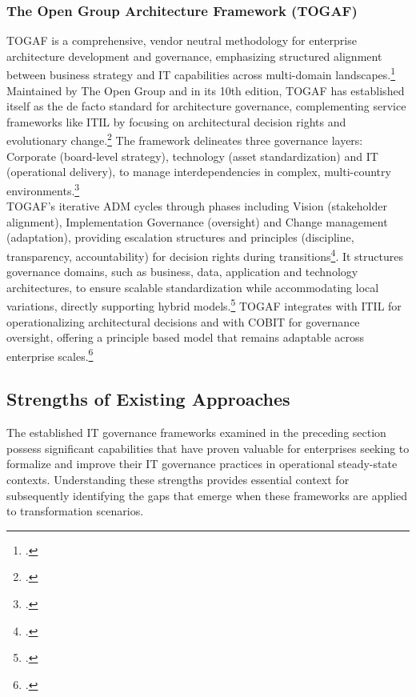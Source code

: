 \subsubsection{The Open Group Architecture Framework (TOGAF)}
\label{subsubsec:TOGAF}
\ac{TOGAF} is a comprehensive, vendor neutral methodology for enterprise architecture development and governance, emphasizing structured alignment between business strategy and IT capabilities across multi-domain landscapes.\footcite[607]{krcmarInformationsmanagement2015}
Maintained by The Open Group and in its 10th edition, \ac{TOGAF} has established itself as the de facto standard for architecture governance, complementing service frameworks like \ac{ITIL} by focusing on architectural decision rights and evolutionary change.\footcite[622]{krcmarInformationsmanagement2015}
The framework delineates three governance layers: Corporate (board-level strategy), technology (asset standardization) and IT (operational delivery), to manage interdependencies in complex, multi-country environments.\footcite[607]{krcmarInformationsmanagement2015}
\\
\ac{TOGAF}'s iterative \ac{ADM} cycles through phases including Vision (stakeholder alignment), Implementation Governance (oversight) and Change management (adaptation), providing escalation structures and principles (discipline, transparency, accountability) for decision rights during transitions\footcite[607-608]{krcmarInformationsmanagement2015}.
It structures governance domains, such as business, data, application and technology architectures, to ensure scalable standardization while accommodating local variations, directly supporting hybrid models.\footcite[622]{krcmarInformationsmanagement2015}
\ac{TOGAF} integrates with \ac{ITIL} for operationalizing architectural decisions and with \ac{COBIT} for governance oversight, offering a principle based model that remains adaptable across enterprise scales.\footcite[608]{krcmarInformationsmanagement2015}

\subsection{Strengths of Existing Approaches}
\label{subsec:StrengthsOfExistingApproaches}
The established IT governance frameworks examined in the preceding section possess significant capabilities that have proven valuable for enterprises seeking to formalize and improve their IT governance practices in operational steady-state contexts.
Understanding these strengths provides essential context for subsequently identifying the gaps that emerge when these frameworks are applied to transformation scenarios.

